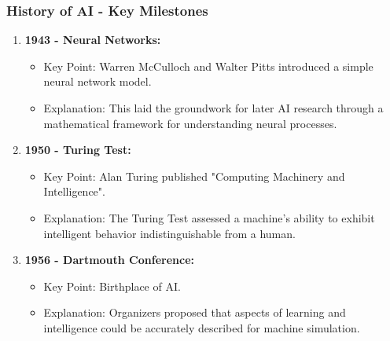 \documentclass[aspectratio=169]{beamer}
\begin{document}
\begin{frame}[fragile]
    \frametitle{History of AI - Key Milestones}
    \begin{enumerate}
        \item {\bf 1943 - Neural Networks:}
        \begin{itemize}
            \item Key Point: Warren McCulloch and Walter Pitts introduced a simple neural network model.
            \item Explanation: This laid the groundwork for later AI research through a mathematical framework for understanding neural processes.
        \end{itemize}

        \item {\bf 1950 - Turing Test:}
        \begin{itemize}
            \item Key Point: Alan Turing published "Computing Machinery and Intelligence".
            \item Explanation: The Turing Test assessed a machine's ability to exhibit intelligent behavior indistinguishable from a human.
        \end{itemize}

        \item {\bf 1956 - Dartmouth Conference:}
        \begin{itemize}
            \item Key Point: Birthplace of AI.
            \item Explanation: Organizers proposed that aspects of learning and intelligence could be accurately described for machine simulation.
        \end{itemize}
    \end{enumerate}
\end{frame}
\end{document}
